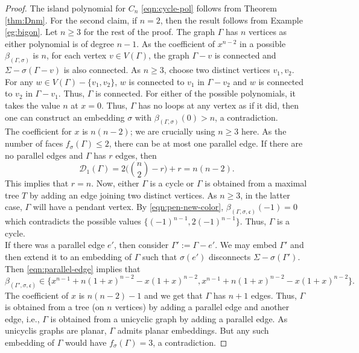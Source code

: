 \documentclass[10pt, reqno]{amsart}
\newcommand{\bgd}{\begin{displaymath}}
\newcommand{\edd}{\end{displaymath}}
\newcommand{\hf}{\hspace*{0.5cm}}
\theoremstyle{plain}
\theoremstyle{remark}
\theoremstyle{definition}
\numberwithin{equation}{section}
\begin{document}
\begin{proof}
The island polynomial for $C_n$ \eqref{eqn:cycle-pol} follows from Theorem \ref{thm:Dnm}. For the second claim, if $n=2$, then the result follows from Example \ref{eg:bigon}. Let $n\geq 3$ for the rest of the proof. The graph $\Gamma$ has $n$ vertices as either polynomial is of degree $n-1$. As the coefficient of $x^{n-2}$ in a possible $\beta_{(\Gamma, \sigma)}$ is $n$, for each vertex $v\in V(\Gamma)$, the graph $\Gamma-v$ is connected and $\Sigma-\sigma(\Gamma-v)$ is also connected. As $n\geq 3$, choose two distinct vertices $v_1, v_2$. For any $w\in V(\Gamma)-\{v_1,v_2\}$, $w$ is connected to $v_1$ in $\Gamma-v_2$ and $w$ is connected to $v_2$ in $\Gamma-v_1$. Thus, $\Gamma$ is connected. For either of the possible polynomials, it takes the value $n$ at $x=0$. Thus, $\Gamma$ has no loops at any vertex as if it did, then one can construct an embedding $\sigma$ with $\beta_{(\Gamma,\sigma)}(0)>n$, a contradiction. \\
\hf The coefficient for $x$ is $n(n-2)$; we are crucially using $n\geq 3$ here. As the number of faces $f_\sigma(\Gamma)\leq 2$, there can be at most one parallel edge. If there are no parallel edges and $\Gamma$ has $r$ edges, then 
\bgd
\mathcal{D}_1(\Gamma)=2\bigg({n \choose 2}-r\bigg)+r=n(n-2).
\edd
This implies that $r=n$. Now, either $\Gamma$ is a cycle or $\Gamma$ is obtained from a maximal tree $T$ by adding an edge joining two distinct vertices. As $n\geq 3$, in the latter case, $\Gamma$ will have a pendant vertex. By \eqref{eqn:pen-new-color}, $\beta_{(\Gamma,\sigma,\mathfrak{c})}(-1)=0$ which contradicts the possible values $\{(-1)^{n-1}, 2(-1)^{n-1}\}$. Thus, $\Gamma$ is a cycle.\\
\hf If there was a parallel edge $e'$, then consider $\Gamma':=\Gamma-e'$. We may embed $\Gamma'$ and then extend it to an embedding of $\Gamma$ such that $\sigma(e')$ disconnects $\Sigma-\sigma(\Gamma')$. Then \eqref{eqn:parallel-edge} implies that
$$\beta_{(\Gamma',\sigma,\mathfrak{c})}\in \{x^{n-1}+n(1+x)^{n-2}-x(1+x)^{n-2},x^{n-1}+n(1+x)^{n-2}-x(1+x)^{n-2}\}.$$
The coefficient of $x$ is $n(n-2)-1$ and we get that $\Gamma$ has $n+1$ edges. Thus, $\Gamma$ is obtained from a tree (on $n$ vertices) by adding a parallel edge and another edge, i.e., $\Gamma$ is obtained from a unicyclic graph by adding a parallel edge. As unicyclis graphs are planar, $\Gamma$ admits planar embeddings. But any such embedding of $\Gamma$ would have $f_\sigma(\Gamma)=3$, a contradiction. 
\end{proof}
\end{document}
